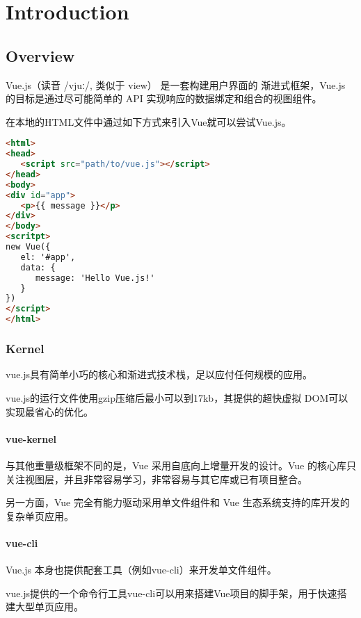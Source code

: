 \part{Introduction}


\chapter{Overview}

Vue.js（读音 /vjuː/, 类似于 view） 是一套构建用户界面的 渐进式框架，Vue.js 的目标是通过尽可能简单的 API 实现响应的数据绑定和组合的视图组件。

在本地的HTML文件中通过如下方式来引入Vue就可以尝试Vue.js。

\begin{lstlisting}[language=HTML]
<html>
<head>
   <script src="path/to/vue.js"></script>
</head>
<body>
<div id="app">
   <p>{{ message }}</p>
</div>
</body>
<scritpt>
new Vue({
   el: '#app',
   data: {
      message: 'Hello Vue.js!'
   }
})
</script>
</html>
\end{lstlisting}

\section{Kernel}

vue.js具有简单小巧的核心和渐进式技术栈，足以应付任何规模的应用。

vue.js的运行文件使用gzip压缩后最小可以到17kb，其提供的超快虚拟 DOM可以实现最省心的优化。



\subsection{vue-kernel}

与其他重量级框架不同的是，Vue 采用自底向上增量开发的设计。Vue 的核心库只关注视图层，并且非常容易学习，非常容易与其它库或已有项目整合。

另一方面，Vue 完全有能力驱动采用单文件组件和 Vue 生态系统支持的库开发的复杂单页应用。

\subsection{vue-cli}


Vue.js 本身也提供配套工具（例如vue-cli）来开发单文件组件。


vue.js提供的一个命令行工具vue-cli可以用来搭建Vue项目的脚手架，用于快速搭建大型单页应用。

